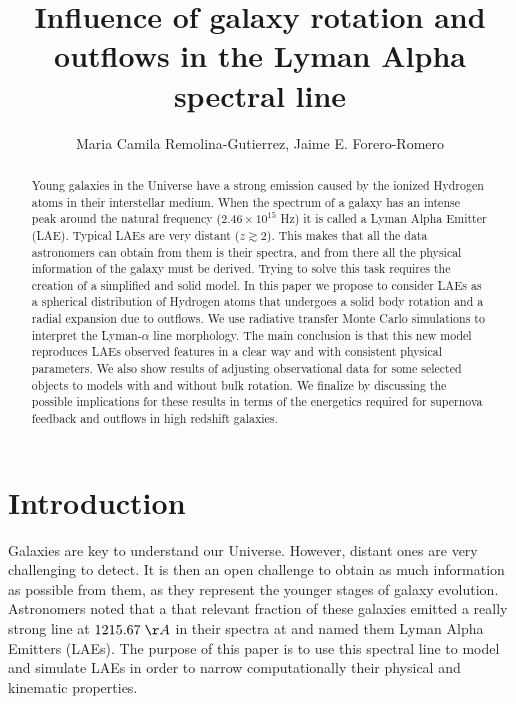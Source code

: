 \documentclass[twocolappendix]{latex/emulateapj}
\begin{document}
\title{Influence of galaxy rotation and outflows in the Lyman Alpha spectral line}


\author{Maria Camila Remolina-Gutierrez, Jaime E. Forero-Romero} 


\begin{abstract}
\noindent Young galaxies in the Universe have a strong \lya emission caused by the ionized Hydrogen atoms in their interstellar medium. When the spectrum of a galaxy has an intense peak around the \lya natural frequency ($2.46\times 10^{15}$ Hz) it is called a Lyman Alpha Emitter (LAE). Typical LAEs are very distant ($z \gtrsim 2$). This makes that all the data astronomers can obtain from them is their spectra, and from there all the physical information of the galaxy must be derived. Trying to solve this task requires the creation of a simplified and solid model. In this paper we propose to consider LAEs as a spherical distribution of Hydrogen atoms that undergoes a solid body rotation and a radial expansion due to outflows. We use radiative transfer Monte Carlo simulations to interpret the Lyman-$\alpha$ line morphology. The main conclusion is that this new model reproduces LAEs observed features in a clear way and with consistent physical parameters. We also show results of adjusting observational data for some selected objects to models with and without bulk rotation. We finalize by discussing the possible implications for these results in terms of the energetics required for supernova feedback and outflows in high redshift galaxies. \\
\end{abstract}

\section{Introduction}
\label{sec:intro}

Galaxies are key to understand our Universe. However, distant ones are very challenging to detect. It is then an open challenge to obtain as much information as possible from them, as they represent the younger stages of galaxy evolution. Astronomers noted that a that relevant fraction of these galaxies emitted a really strong line at $1215.67\;\AA$ in their spectra at  and named them Lyman Alpha Emitters (LAEs). The purpose of this paper is to use this spectral line to model and simulate LAEs in order to narrow computationally their physical and kinematic properties. \\
\end{document}
